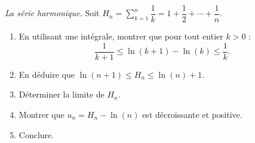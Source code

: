 \documentclass[]{exercices}
\begin{document}
\newcommand{\e}{\mathrm{e}}


\begin{exercice}[\di] \emph{La série harmonique.}
	Soit $H_n =\sum\limits_{k=1}^n\dfrac1k= 1 + \dfrac12 + \cdots + \dfrac1n$.
	\begin{enumerate}
		\item En utilisant une intégrale, montrer que pour tout entier $k>0$ : 
			\[
				\dfrac1{k + 1} \leq \ln (k + 1)-\ln (k) \leq \dfrac1k.
			\]
		\item En déduire que $\ln (n + 1) \leq H_n \leq \ln (n) + 1$.
		\item Déterminer la limite de $H_n$.
		\item Montrer que $u_n = H_n-\ln (n)$ est décroissante et positive.
		\item Conclure.
	\end{enumerate}
\end{exercice}
\end{document}
